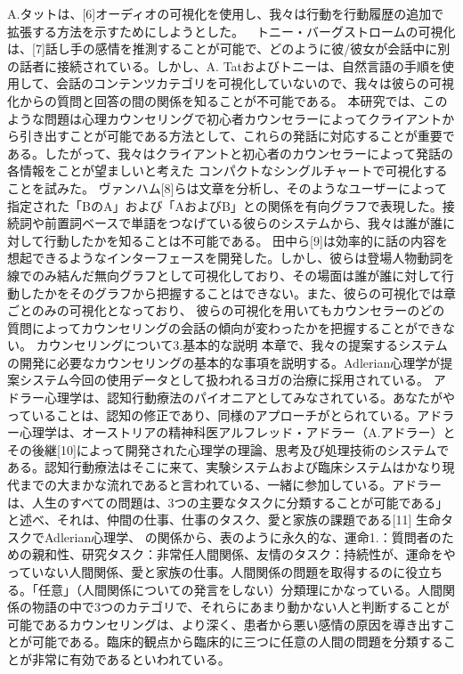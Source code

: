 \documentclass[shuuron]{kuee}
\begin{document}
 A.タットは、[6]オーディオの可視化を使用し、我々は行動を行動履歴の追加で拡張する方法を示すためにしようとした。
  トニー・バーグストロームの可視化は、[7]話し手の感情を推測することが可能で、どのように彼/彼女が会話中に別の話者に接続されている。しかし、A. Tatおよびトニーは、自然言語の手順を使用して、会話のコンテンツカテゴリを可視化していないので、我々は彼らの可視化からの質問と回答の間の関係を知ることが不可能である。
 本研究では、このような問題は心理カウンセリングで初心者カウンセラーによってクライアントから引き出すことが可能である方法として、これらの発話に対応することが重要である。したがって、我々はクライアントと初心者のカウンセラーによって発話の各情報をことが望ましいと考えた コンパクトなシングルチャートで可視化することを試みた。
 ヴァンハム[8]らは文章を分析し、そのようなユーザーによって指定された「BのA」および「AおよびB」との関係を有向グラフで表現した。接続詞や前置詞ベースで単語をつなげている彼らのシステムから、我々は誰が誰に対して行動したかを知ることは不可能である。
 田中ら[9]は効率的に話の内容を想起できるようなインターフェースを開発した。しかし、彼らは登場人物動詞を線でのみ結んだ無向グラフとして可視化しており、その場面は誰が誰に対して行動したかをそのグラフから把握することはできない。また、彼らの可視化では章ごとのみの可視化となっており、 彼らの可視化を用いてもカウンセラーのどの質問によってカウンセリングの会話の傾向が変わったかを把握することができない。
カウンセリングについて3.基本的な説明
 本章で、我々の提案するシステムの開発に必要なカウンセリングの基本的な事項を説明する。Adlerian心理学が提案システム今回の使用データとして扱われるヨガの治療に採用されている。
アドラー心理学は、認知行動療法のパイオニアとしてみなされている。あなたがやっていることは、認知の修正であり、同様のアプローチがとられている。アドラー心理学は、オーストリアの精神科医アルフレッド・アドラー（A.アドラー）とその後継[10]によって開発された心理学の理論、思考及び処理技術のシステムである。認知行動療法はそこに来て、実験システムおよび臨床システムはかなり現代までの大まかな流れであると言われている、一緒に参加している。アドラーは、人生のすべての問題は、3つの主要なタスクに分類することが可能である」と述べ、それは、仲間の仕事、仕事のタスク、愛と家族の課題である[11] 生命タスクでAdlerian心理学、 の関係から、表のように永久的な、運命1.：質問者のための親和性、研究タスク：非常任人間関係、友情のタスク：持続性が、運命をやっていない人間関係、愛と家族の仕事。人間関係の問題を取得するのに役立ちる。「任意」（人間関係についての発言をしない）分類理にかなっている。人間関係の物語の中で3つのカテゴリで、それらにあまり動かない人と判断することが可能であるカウンセリングは、より深く、患者から悪い感情の原因を導き出すことが可能である。臨床的観点から臨床的に三つに任意の人間の問題を分類することが非常に有効であるといわれている。
\end{document}
